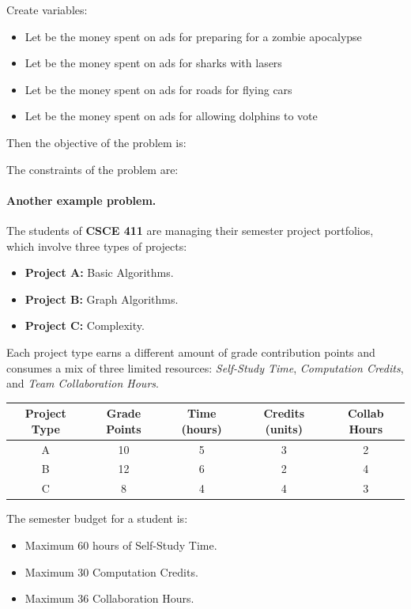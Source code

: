 \documentclass[11  pt]{article}
\begin{document}
\vs{1cm}
Create variables:
\begin{itemize}
\item
Let  be the money spent on ads for preparing for a zombie apocalypse
\item
Let  be the money spent on ads for sharks with lasers
\item
Let  be the money spent on ads for roads for flying cars
\item
Let  be the money spent on ads for allowing dolphins to vote
\end{itemize}
Then the objective of the problem is:

\vs{2cm}
The constraints of the problem are: 

\vs{4cm}
		
	
\newpage

\paragraph{Another example problem.} 
The students of \textbf{CSCE 411} are managing their semester project portfolios, which involve three types of projects:

\begin{itemize}
    \item \textbf{Project A:} Basic Algorithms.
    \item \textbf{Project B:} Graph Algorithms.
    \item \textbf{Project C:} Complexity. 
\end{itemize}

Each project type earns a different amount of grade contribution points and consumes a mix of three limited resources: \textit{Self-Study Time}, \textit{Computation Credits}, and \textit{Team Collaboration Hours}.

\begin{center}
\begin{tabular}{|c|c|c|c|c|}
\hline
\textbf{Project Type} & \textbf{Grade Points} & \textbf{Time (hours)} & \textbf{Credits (units)} & \textbf{Collab Hours} \\
\hline
A & 10 & 5 & 3 & 2 \\
B & 12 & 6 & 2 & 4 \\
C & 8 & 4 & 4 & 3 \\
\hline
\end{tabular}
\end{center}

The semester budget for a student is:
\begin{itemize}
    \item Maximum 60 hours of Self-Study Time.
    \item Maximum 30 Computation Credits.
    \item Maximum 36 Collaboration Hours.
\end{itemize}
\end{document}
